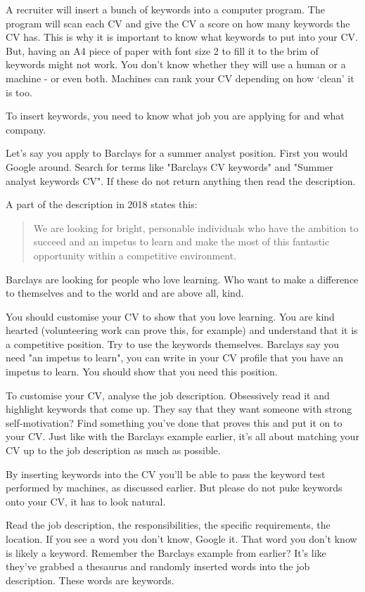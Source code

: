 \documentclass{article}
\begin{document}
A recruiter will insert a bunch of keywords into a computer program. The
program will scan each CV and give the CV a score on how many keywords
the CV has. This is why it is important to know what keywords to put
into your CV. But, having an A4 piece of paper with font size 2 to fill
it to the brim of keywords might not work. You don't know whether they
will use a human or a machine - or even both. Machines can rank your CV
depending on how `clean' it is too.

To insert keywords, you need to know what job you are applying for and
what company.

Let's say you apply to Barclays for a summer analyst position.
First you would Google around. Search for terms like "Barclays CV
keywords" and "Summer analyst keywords CV". If these do not return
anything then read the description.

A part of the description in 2018 states this:

\begin{quote}We are looking for bright, personable individuals who have the ambition to succeed and an impetus to learn and make the most of this
fantastic opportunity within a competitive environment.
\end{quote}

Barclays are looking for people who love learning. Who want to make a
difference to themselves and to the world and are above all, kind.

You should customise your CV to show that you love learning. You are
kind hearted (volunteering work can prove this, for example) and
understand that it is a competitive position. Try to use the keywords
themselves. Barclays say you need "an impetus to learn", you can write
in your CV profile that you have an impetus to learn. You should show
that you need this position.

To customise your CV, analyse the job description. Obsessively read it
and highlight keywords that come up. They say that they want someone
with strong self-motivation? Find something you've done that proves this
and put it on to your CV. Just like with the Barclays example earlier,
it's all about matching your CV up to the job description as much as
possible.

By inserting keywords into the CV you'll be able to pass the keyword
test performed by machines, as discussed earlier. But please do not puke
keywords onto your CV, it has to look natural.

Read the job description, the responsibilities, the specific
requirements, the location. If you see a word you don't know, Google it.
That word you don't know is likely a keyword. Remember the Barclays
example from earlier? It's like they've grabbed a thesaurus and randomly
inserted words into the job description. These words are keywords.
\end{document}
